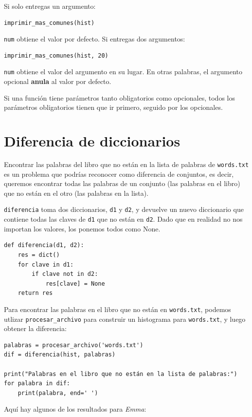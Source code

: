\documentclass[10pt]{book}
\begin{document}
Si solo entregas un argumento:

\begin{verbatim}
imprimir_mas_comunes(hist)
\end{verbatim}

{\tt num} obtiene el valor por defecto.  Si entregas dos argumentos:

\begin{verbatim}
imprimir_mas_comunes(hist, 20)
\end{verbatim}

{\tt num} obtiene el valor del argumento en su lugar.  En otras
palabras, el argumento opcional {\bf anula} al valor por defecto.

Si una función tiene parámetros tanto obligatorios como opcionales, todos
los parámetros obligatorios tienen que ir primero, seguido por los
opcionales.


\section{Diferencia de diccionarios}
\label{dictsub}

Encontrar las palabras del libro que no están en la lista de palabras
de {\tt words.txt} es un problema que podrías reconocer como diferencia
de conjuntos, es decir, queremos encontrar todas las palabras de un
conjunto (las palabras en el libro) que no están en el otro (las
palabras en la lista).

{\tt diferencia} toma dos diccionarios, {\tt d1} y {\tt d2}, y devuelve un
nuevo diccionario que contiene todas las claves de {\tt d1} que no están
en {\tt d2}.  Dado que en realidad no nos importan los valores,
los ponemos todos como None.

\begin{verbatim}
def diferencia(d1, d2):
    res = dict()
    for clave in d1:
        if clave not in d2:
            res[clave] = None
    return res
\end{verbatim}
%
Para encontrar las palabras en el libro que no están en {\tt words.txt},
podemos utlizar \verb"procesar_archivo" para construir un histograma para
{\tt words.txt}, y luego obtener la diferencia:

\begin{verbatim}
palabras = procesar_archivo('words.txt')
dif = diferencia(hist, palabras)

print("Palabras en el libro que no están en la lista de palabras:")
for palabra in dif:
    print(palabra, end=' ')
\end{verbatim}
%
Aquí hay algunos de los resultados para {\em Emma}:
\end{document}
